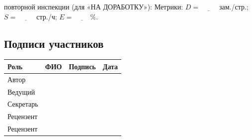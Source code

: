 \documentclass[12pt,a4paper]{article}
\begin{document}
\medskip
{} повторной инспекции (для «НА ДОРАБОТКУ»):
\underline{\hspace{4cm}} \quad Метрики: $D = \underline{\hspace{1cm}}$ зам./стр.;
$S = \underline{\hspace{1cm}}$ стр./ч; $E = \underline{\hspace{1cm}}\%$.

\subsection{Подписи участников}

\begin{table}[h!]
\centering
\begin{tabularx}{0.95\textwidth}{
  >{\raggedright\arraybackslash}p{3.2cm}
  >{\raggedright\arraybackslash}X
  >{\centering\arraybackslash}p{3.6cm}
  >{\centering\arraybackslash}p{2.4cm}}
\toprule
\textbf{Роль} & \textbf{ФИО} & \textbf{Подпись} & \textbf{Дата} \\
\midrule
Автор & & & \\
\addlinespace
Ведущий & & & \\
\addlinespace
Секретарь & & & \\
\addlinespace
Рецензент & & & \\
\addlinespace
Рецензент & & & \\
\bottomrule
\end{tabularx}
\end{table}
\end{document}
